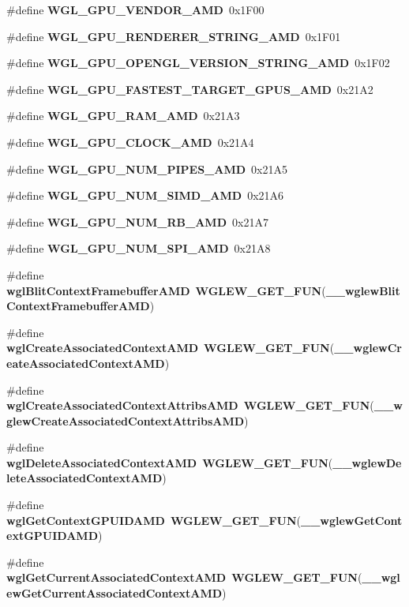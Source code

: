 \begin{DoxyCompactItemize}
\item 
\#define {\bf W\+G\+L\+\_\+\+G\+P\+U\+\_\+\+V\+E\+N\+D\+O\+R\+\_\+\+A\+MD}~0x1\+F00
\item 
\#define {\bf W\+G\+L\+\_\+\+G\+P\+U\+\_\+\+R\+E\+N\+D\+E\+R\+E\+R\+\_\+\+S\+T\+R\+I\+N\+G\+\_\+\+A\+MD}~0x1\+F01
\item 
\#define {\bf W\+G\+L\+\_\+\+G\+P\+U\+\_\+\+O\+P\+E\+N\+G\+L\+\_\+\+V\+E\+R\+S\+I\+O\+N\+\_\+\+S\+T\+R\+I\+N\+G\+\_\+\+A\+MD}~0x1\+F02
\item 
\#define {\bf W\+G\+L\+\_\+\+G\+P\+U\+\_\+\+F\+A\+S\+T\+E\+S\+T\+\_\+\+T\+A\+R\+G\+E\+T\+\_\+\+G\+P\+U\+S\+\_\+\+A\+MD}~0x21\+A2
\item 
\#define {\bf W\+G\+L\+\_\+\+G\+P\+U\+\_\+\+R\+A\+M\+\_\+\+A\+MD}~0x21\+A3
\item 
\#define {\bf W\+G\+L\+\_\+\+G\+P\+U\+\_\+\+C\+L\+O\+C\+K\+\_\+\+A\+MD}~0x21\+A4
\item 
\#define {\bf W\+G\+L\+\_\+\+G\+P\+U\+\_\+\+N\+U\+M\+\_\+\+P\+I\+P\+E\+S\+\_\+\+A\+MD}~0x21\+A5
\item 
\#define {\bf W\+G\+L\+\_\+\+G\+P\+U\+\_\+\+N\+U\+M\+\_\+\+S\+I\+M\+D\+\_\+\+A\+MD}~0x21\+A6
\item 
\#define {\bf W\+G\+L\+\_\+\+G\+P\+U\+\_\+\+N\+U\+M\+\_\+\+R\+B\+\_\+\+A\+MD}~0x21\+A7
\item 
\#define {\bf W\+G\+L\+\_\+\+G\+P\+U\+\_\+\+N\+U\+M\+\_\+\+S\+P\+I\+\_\+\+A\+MD}~0x21\+A8
\item 
\#define {\bf wgl\+Blit\+Context\+Framebuffer\+A\+MD}~{\bf W\+G\+L\+E\+W\+\_\+\+G\+E\+T\+\_\+\+F\+UN}({\bf \+\_\+\+\_\+wglew\+Blit\+Context\+Framebuffer\+A\+MD})
\item 
\#define {\bf wgl\+Create\+Associated\+Context\+A\+MD}~{\bf W\+G\+L\+E\+W\+\_\+\+G\+E\+T\+\_\+\+F\+UN}({\bf \+\_\+\+\_\+wglew\+Create\+Associated\+Context\+A\+MD})
\item 
\#define {\bf wgl\+Create\+Associated\+Context\+Attribs\+A\+MD}~{\bf W\+G\+L\+E\+W\+\_\+\+G\+E\+T\+\_\+\+F\+UN}({\bf \+\_\+\+\_\+wglew\+Create\+Associated\+Context\+Attribs\+A\+MD})
\item 
\#define {\bf wgl\+Delete\+Associated\+Context\+A\+MD}~{\bf W\+G\+L\+E\+W\+\_\+\+G\+E\+T\+\_\+\+F\+UN}({\bf \+\_\+\+\_\+wglew\+Delete\+Associated\+Context\+A\+MD})
\item 
\#define {\bf wgl\+Get\+Context\+G\+P\+U\+I\+D\+A\+MD}~{\bf W\+G\+L\+E\+W\+\_\+\+G\+E\+T\+\_\+\+F\+UN}({\bf \+\_\+\+\_\+wglew\+Get\+Context\+G\+P\+U\+I\+D\+A\+MD})
\item 
\#define {\bf wgl\+Get\+Current\+Associated\+Context\+A\+MD}~{\bf W\+G\+L\+E\+W\+\_\+\+G\+E\+T\+\_\+\+F\+UN}({\bf \+\_\+\+\_\+wglew\+Get\+Current\+Associated\+Context\+A\+MD})

\end{DoxyCompactItemize}
